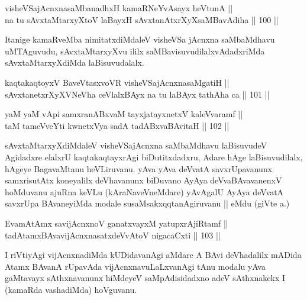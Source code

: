 \begin{shl}
visheVSajAcnxnasaMbanadhxH kamaRNeYvAsayx heVtunA || \\
na tu sAvxtaMtarxyXtoV laBayxH sAvxtanAtxrXyXsaMBavAdiha \hfill || 100 ||  
\end{shl}

\begin{artha}
Itanige kamaRveMba nimitatxdiMdaleV visheVSa jAcnxna saMbaMdhavu
uMTAguvudu, sAvxtaMtarxyXvu ililx saMBavisuvudilalxvAdadxriMda\break
sAvxtaMtarxyXdiMda laBisuvudalalx.
\end{artha}


\begin{shl}
kaqtakaqtoyxV BaveVtasxvoVR visheVSajAcnxnasaMgatiH || \\
sAvxtanetxrXyXVNeVha ceVlalxBAyx na tu laBAyx tathA\s \s ha ca \hfill || 101 || 
\end{shl}

\begin{shl}
yaM yaM vA\s pi samxranABxvaM tayxjatayxnetxV kaleVvaramf ||  \\
taM tameVveYti kwnetxVya sadA tadABxvaBAvitaH \hfill || 102 ||  
\end{shl}

\begin{artha}
sAvxtaMtarxyXdiMdaleV visheVSajAcnxna saMbaMdhavu laBisuvudeV
Agidadxre elalxrU kaqtakaqtayxrAgi biDutitxdadxru, Adare hAge
laBisuvudilalx, hAgeye BagavaMtanu heVLiruvanu. yAva yAva deVvatA
savxrUpavanunx samxrisutAtx koneyalilx deVhavanunx biDuvano AyAya
deVvaBAvavanenxV hoMduvanu ajuRna keVLu (kAraNaveVneMdare) yAvAgalU
AyAya deVvatA savxrUpa BAvaneyiMda modale susaMsakxqqtanAgiruvanu ||
eMdu (giVte  a.\quad) 
\end{artha}


\begin{shl}
EvamAtAmx savijAcnxnoV ganatxvayxM yatupxrA\s jiRtamf || \\
tadAtamxBAvavijAcnxnasatxdeVvAtoV nigacaCxti \hfill || 103 ||  
\end{shl}

\begin{artha}
I riVtiyAgi vijAcnxnadiMda kUDidavanAgi aMdare A BAvi deVhadalilx
mADida Atamx BAvanA rUpavAda vijAcnxnavuLaLxvanAgi tAnu modalu yAva
gaMtavayx sAthxnavanunx hiMdeyeV saMpAdisidadxno adeV sAthxnakekx I
(kamaRda vashadiMda) hoVguvanu.
\end{artha}

